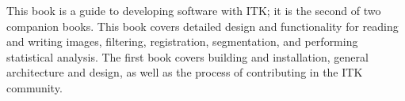 This book is a guide to developing software with ITK; it is the second of two
companion books. This book covers detailed design and functionality for
reading and writing images, filtering, registration, segmentation, and
performing statistical analysis. The first book covers building and installation, general
architecture and design, as well as the process of contributing in the ITK
community.
